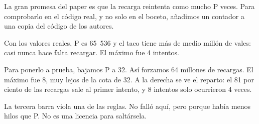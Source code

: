 La gran promesa del paper es que la recarga reintenta como mucho P veces. Para comprobarlo en el código real, y no solo en el boceto, añadimos un contador a una copia del código de los autores.

Con los valores reales, P es 65~536 y el taco tiene más de medio millón de vales: casi nunca hace falta recargar. El máximo fue 4 intentos.

Para ponerlo a prueba, bajamos P a 32. Así forzamos 64 millones de recargas. El máximo fue 8, muy lejos de la cota de 32. A la derecha se ve el reparto: el 81 por ciento de las recargas sale al primer intento, y 8 intentos solo ocurrieron 4 veces.

La tercera barra viola una de las reglas. No falló aquí, pero porque había menos hilos que P. No es una licencia para saltársela.
